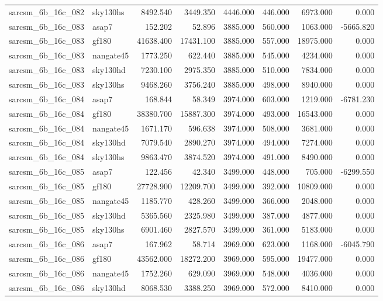 \begin{tabular}{llrrrrrr}
sarcsm\_6b\_16c\_082 & sky130hs & 8492.540 & 3449.350 & 4446.000 & 446.000 & 6973.000 & 0.000 \\
sarcsm\_6b\_16c\_083 & asap7 & 152.202 & 52.896 & 3885.000 & 560.000 & 1063.000 & -5665.820 \\
sarcsm\_6b\_16c\_083 & gf180 & 41638.400 & 17431.100 & 3885.000 & 557.000 & 18975.000 & 0.000 \\
sarcsm\_6b\_16c\_083 & nangate45 & 1773.250 & 622.440 & 3885.000 & 545.000 & 4234.000 & 0.000 \\
sarcsm\_6b\_16c\_083 & sky130hd & 7230.100 & 2975.350 & 3885.000 & 510.000 & 7834.000 & 0.000 \\
sarcsm\_6b\_16c\_083 & sky130hs & 9468.260 & 3756.240 & 3885.000 & 498.000 & 8940.000 & 0.000 \\
sarcsm\_6b\_16c\_084 & asap7 & 168.844 & 58.349 & 3974.000 & 603.000 & 1219.000 & -6781.230 \\
sarcsm\_6b\_16c\_084 & gf180 & 38380.700 & 15887.300 & 3974.000 & 493.000 & 16543.000 & 0.000 \\
sarcsm\_6b\_16c\_084 & nangate45 & 1671.170 & 596.638 & 3974.000 & 508.000 & 3681.000 & 0.000 \\
sarcsm\_6b\_16c\_084 & sky130hd & 7079.540 & 2890.270 & 3974.000 & 494.000 & 7274.000 & 0.000 \\
sarcsm\_6b\_16c\_084 & sky130hs & 9863.470 & 3874.520 & 3974.000 & 491.000 & 8490.000 & 0.000 \\
sarcsm\_6b\_16c\_085 & asap7 & 122.456 & 42.340 & 3499.000 & 448.000 & 705.000 & -6299.550 \\
sarcsm\_6b\_16c\_085 & gf180 & 27728.900 & 12209.700 & 3499.000 & 392.000 & 10809.000 & 0.000 \\
sarcsm\_6b\_16c\_085 & nangate45 & 1185.770 & 428.260 & 3499.000 & 366.000 & 2048.000 & 0.000 \\
sarcsm\_6b\_16c\_085 & sky130hd & 5365.560 & 2325.980 & 3499.000 & 387.000 & 4877.000 & 0.000 \\
sarcsm\_6b\_16c\_085 & sky130hs & 6901.460 & 2827.570 & 3499.000 & 361.000 & 5183.000 & 0.000 \\
sarcsm\_6b\_16c\_086 & asap7 & 167.962 & 58.714 & 3969.000 & 623.000 & 1168.000 & -6045.790 \\
sarcsm\_6b\_16c\_086 & gf180 & 43562.000 & 18272.200 & 3969.000 & 595.000 & 19477.000 & 0.000 \\
sarcsm\_6b\_16c\_086 & nangate45 & 1752.260 & 629.090 & 3969.000 & 548.000 & 4036.000 & 0.000 \\
sarcsm\_6b\_16c\_086 & sky130hd & 8068.530 & 3388.250 & 3969.000 & 572.000 & 8410.000 & 0.000 \\

\end{tabular}
